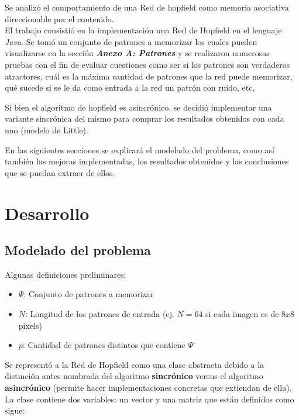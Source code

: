 \documentclass[%
    final,
    reprint,
    notitlepage,
    narroweqnarray,
    inline,
    twoside,
    invited
    ]{ieee}
\begin{document}
\par Se analizó el comportamiento de una Red de hopfield como memoria asociativa direccionable por el contenido.\\
El trabajo consistió en la implementación una Red de Hopfield en el lenguaje \textit{Java}. Se tomó un conjunto de patrones a memorizar los cuales pueden visualizarse en la sección \textbf{\textit{Anexo A: Patrones}} y se realizaron numerosas pruebas con el fin de evaluar cuestiones como ser si los patrones son verdaderos atractores, cuál es la máxima cantidad de patrones que la red puede memorizar, qué sucede si se le da como entrada a la red un patrón con ruido, etc.\\
\par Si bien el algoritmo de hopfield es asincrónico, se decidió implementar una variante sincrónica del mismo para comprar los resultados obtenidos con cada uno (modelo de Little).\\
\par En las siguientes secciones se explicará el modelado del problema, como así también las mejoras implementadas, los resultados obtenidos y las conclusiones que se puedan extraer de ellos.



\section{Desarrollo}

\subsection{Modelado del problema}

\par Algunas definiciones preliminares:\\
\begin{itemize}
\item \textbf{$\Psi$}: Conjunto de patrones a memorizar
\item \textbf{$N$}: Longitud de los patrones de entrada (ej. $N = 64$ si cada imagen es de $8x8$ pixels)
\item \textbf{$p$}: Cantidad de patrones distintos que contiene $\Psi$\\
\end{itemize}

\par Se representó a la Red de Hopfield  como una clase abstracta debido a la distinción antes nombrada del algoritmo \textbf{sincrónico} versus el algoritmo \textbf{asincrónico} (permite hacer implementaciones concretas que extiendan de ella).\\
La clase contiene dos variables: un vector y una matriz que están definidos como sigue:\\
\end{document}
